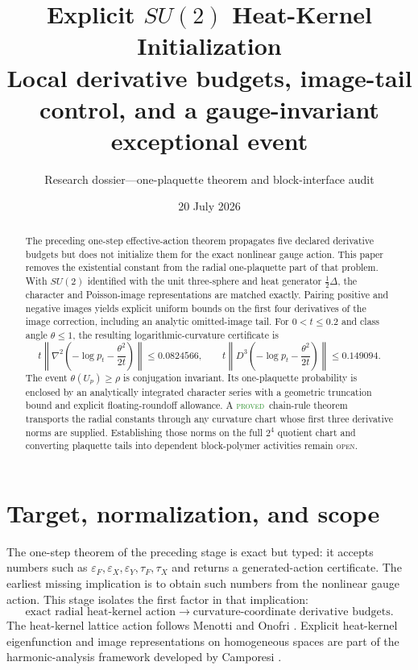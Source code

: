 \documentclass[11pt]{article}
\title{Explicit \texorpdfstring{$SU(2)$}{SU(2)} Heat-Kernel Initialization\\
\large Local derivative budgets, image-tail control, and a gauge-invariant exceptional event}
\author{Research dossier---one-plaquette theorem and block-interface audit}
\date{20 July 2026}
\theoremstyle{definition}
\newcommand{\statusproved}{\textcolor{ForestGreen}{\textsc{proved}}}
\newcommand{\statusopen}{\textcolor{BrickRed}{\textsc{open}}}
\begin{document}
\maketitle

\begin{abstract}
The preceding one-step effective-action theorem propagates five declared
derivative budgets but does not initialize them for the exact nonlinear gauge
action.  This paper removes the existential constant from the radial
one-plaquette part of that problem.  With $SU(2)$ identified with the unit
three-sphere and heat generator $\frac12\Delta$, the character and
Poisson-image representations are matched exactly.  Pairing positive and
negative images yields explicit uniform bounds on the first four derivatives
of the image correction, including an analytic omitted-image tail.  For
$0<t\le0.2$ and class angle $\theta\le1$, the resulting logarithmic-curvature
certificate is
\[
 t\left\|\nabla^2\left(-\log p_t-\frac{\theta^2}{2t}\right)\right\|
 \le0.0824566,
 \qquad
 t\left\|D^3\left(-\log p_t-\frac{\theta^2}{2t}\right)\right\|
 \le0.149094.
\]
The event $\theta(U_p)\ge\rho$ is conjugation invariant.  Its one-plaquette
probability is enclosed by an analytically integrated character series with a
geometric truncation bound and explicit floating-roundoff allowance.  A
\statusproved\ chain-rule theorem transports the radial constants through any
curvature chart whose first three derivative norms are supplied.  Establishing
those norms on the full $2^4$ quotient chart and converting plaquette tails
into dependent block-polymer activities remain \statusopen.
\end{abstract}

\tableofcontents

\section{Target, normalization, and scope}

The one-step theorem of the preceding stage is exact but typed: it accepts
numbers such as $\varepsilon_F,\varepsilon_X,\varepsilon_Y,\tau_F,\tau_X$ and
returns a generated-action certificate.  The earliest missing implication is
to obtain such numbers from the nonlinear gauge action.  This stage isolates
the first factor in that implication:
\[
 \text{exact radial heat-kernel action}
 \longrightarrow
 \text{curvature-coordinate derivative budgets}.
\]
The heat-kernel lattice action follows Menotti and Onofri
\cite{MenottiOnofri}.  Explicit heat-kernel eigenfunction and image
representations on homogeneous spaces are part of the harmonic-analysis
framework developed by Camporesi \cite{Camporesi}.
\end{document}
